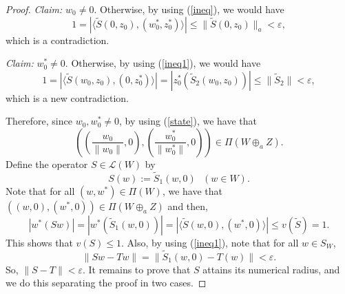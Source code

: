 \documentclass[10pt,a4paper]{amsart}
\theoremstyle{plain}
\theoremstyle{definition}
\newcommand{\eps}{\varepsilon}
\renewcommand{\leq}{\leqslant}
\begin{document}
\begin{proof}
\noindent
{\it Claim:} $w_0 \not= 0$.
Otherwise, by using (\ref{ineq}), we would have
\begin{equation*}
1 = | \langle \widetilde{S}(0, z_0), (w_0^*, z_0^*) \rangle| \leq \|\widetilde{S}(0, z_0)\|_a < \eps,	
\end{equation*}
which is a contradiction.



\noindent
{\it Claim:} $w_0^* \not= 0$.
Otherwise, by using (\ref{ineq1}), we would have
\begin{equation*}
	1 = | \langle \widetilde{S}(w_0, z_0), (0, z_0^*) \rangle| = |z_0^*(\widetilde{S}_2(w_0, z_0))| \leq \| \widetilde{S}_2\| < \eps,	
\end{equation*}	
which is a new contradiction.	
	
\vspace{0.3cm}


Therefore, since $w_0, w_0^* \not=0$, by using (\ref{state}), we have that
\begin{equation} \label{state1}
\left( \left(\frac{w_0}{\|w_0\|}, 0 \right),  \left(\frac{w_0^*}{\|w_0^*\|}, 0 \right) \right) \in \Pi(W \oplus_a Z).
\end{equation}
Define the operator $S \in \mathcal{L}(W)$ by
\begin{equation*}
S(w) := \widetilde{S}_1(w, 0) \ \ \ (w \in W).
\end{equation*}
Note that for all $(w, w^*) \in \Pi(W)$, we have that $((w, 0), (w^*, 0)) \in \Pi(W \oplus_a Z)$ and then,
\begin{equation*}
|w^*(Sw)| = |w^*(\widetilde{S}_1(w, 0))| = | \langle \widetilde{S}(w, 0), (w^*, 0) \rangle| \leq v(\widetilde{S}) = 1.
\end{equation*}
This shows that $v(S) \leq 1$. Also, by using (\ref{ineq1}), note that for all $w \in S_W$,
\begin{equation*}
\|Sw - Tw\| = \|\widetilde{S}_1(w, 0) - T(w)\| < \eps.	
\end{equation*}
So, $\|S - T\| < \eps$. It remains to prove that $S$ attains its numerical radius, and we do this separating the proof in two cases.


\end{proof}
\end{document}
